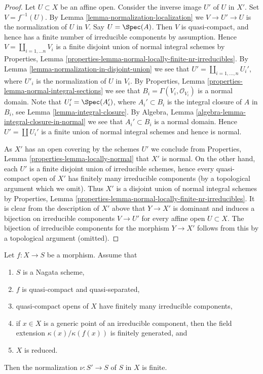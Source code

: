 \begin{proof}
Let $U \subset X$ be an affine open. Consider the
inverse image $U'$ of $U$ in $X'$.
Set $V = f^{-1}(U)$. By Lemma \ref{lemma-normalization-localization}
we $V \to U' \to U$ is the normalization of $U$ in $V$. Say
$U = \Spec(A)$. Then $V$ is quasi-compact, and hence has a finite number of
irreducible components by assumption. Hence
$V = \coprod_{i = 1, \ldots n} V_i$ is a finite disjoint union of
normal integral schemes by
Properties, Lemma \ref{properties-lemma-normal-locally-finite-nr-irreducibles}.
By Lemma \ref{lemma-normalization-in-disjoint-union}
we see that $U' = \coprod_{i = 1, \ldots, n} U_i'$,
where $U'_i$ is the normalization of $U$ in $V_i$.
By Properties, Lemma \ref{properties-lemma-normal-integral-sections}
we see that $B_i = \Gamma(V_i, \mathcal{O}_{V_i})$ is a normal domain.
Note that $U_i' = \Spec(A_i')$, where $A_i' \subset B_i$
is the integral closure of $A$ in $B_i$, see
Lemma \ref{lemma-integral-closure}. By
Algebra, Lemma \ref{algebra-lemma-integral-closure-in-normal}
we see that $A_i' \subset B_i$ is a normal domain.
Hence $U' = \coprod U_i'$ is a finite union of normal integral schemes
and hence is normal.

\medskip\noindent
As $X'$ has an open covering by the schemes $U'$ we conclude from
Properties, Lemma \ref{properties-lemma-locally-normal} that $X'$ is normal.
On the other hand, each $U'$ is a finite disjoint union of irreducible
schemes, hence every quasi-compact open of $X'$ has finitely many irreducible
components (by a topological argument which we omit). Thus $X'$
is a disjoint union of normal integral schemes by
Properties, Lemma \ref{properties-lemma-normal-locally-finite-nr-irreducibles}.
It is clear from the description of $X'$ above that $Y \to X'$
is dominant and induces a bijection on irreducible components
$V \to U'$ for every affine open $U \subset X$. The bijection of
irreducible components for the morphism $Y \to X'$
follows from this by a topological argument (omitted).
\end{proof}

\begin{lemma}
\label{lemma-nagata-normalization-finite-general}
Let $f : X \to S$ be a morphism. Assume that
\begin{enumerate}
\item $S$ is a Nagata scheme,
\item $f$ is quasi-compact and quasi-separated,
\item quasi-compact opens of $X$ have finitely many irreducible components,
\item if $x \in X$ is a generic point of an irreducible component,
then the field extension $\kappa(x)/\kappa(f(x))$ is finitely
generated, and
\item $X$ is reduced.
\end{enumerate}
Then the normalization $\nu : S' \to S$ of $S$ in $X$ is finite.
\end{lemma}

